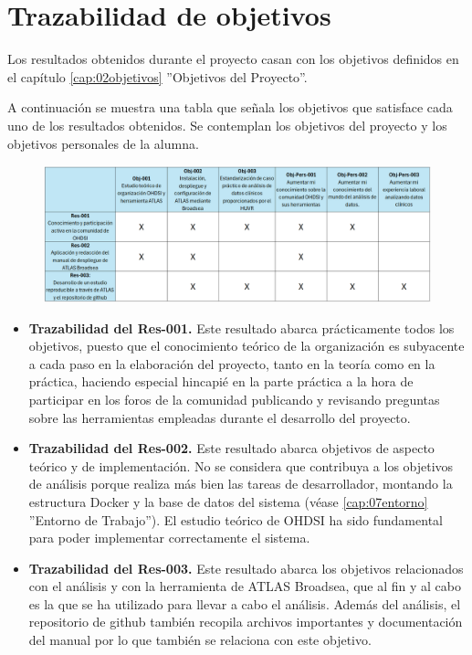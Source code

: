\section{Trazabilidad de objetivos}

Los resultados obtenidos durante el proyecto casan con los objetivos definidos en el capítulo \ref{cap:02objetivos} ''Objetivos del Proyecto''. 

A continuación se muestra una tabla que señala los objetivos que satisface cada uno de los resultados obtenidos. Se contemplan los objetivos del proyecto y los objetivos personales de la alumna.

\begin{figure}[H]
    \centering
    \includegraphics[width=1\textwidth]{tables/trazabilidadObjetivosPers.png}
    \label{table:trazabilidadObjetivosPers}
\end{figure}


\begin{itemize}
    \item \textbf{Trazabilidad del Res-001.} Este resultado abarca prácticamente todos los objetivos, puesto que el conocimiento teórico de la organización es subyacente a cada paso en la elaboración del proyecto, tanto en la teoría como en la práctica, haciendo especial hincapié en la parte práctica a la hora de participar en los foros de la comunidad publicando y revisando preguntas sobre las herramientas empleadas durante el desarrollo del proyecto.
    \item \textbf{Trazabilidad del Res-002.} Este resultado abarca objetivos de aspecto teórico y de implementación. No se considera que contribuya a los objetivos de análisis porque realiza más bien las tareas de desarrollador, montando la estructura Docker y la base de datos del sistema (véase \ref{cap:07entorno} ''Entorno de Trabajo''). El estudio teórico de OHDSI ha sido fundamental para poder implementar correctamente el sistema.
    \item \textbf{Trazabilidad del Res-003.} Este resultado abarca los objetivos relacionados con el análisis y con la herramienta de ATLAS Broadsea, que al fin y al cabo es la que se ha utilizado para llevar a cabo el análisis. Además del análisis, el repositorio de github también recopila archivos importantes y documentación del manual por lo que también se relaciona con este objetivo.
\end{itemize}


